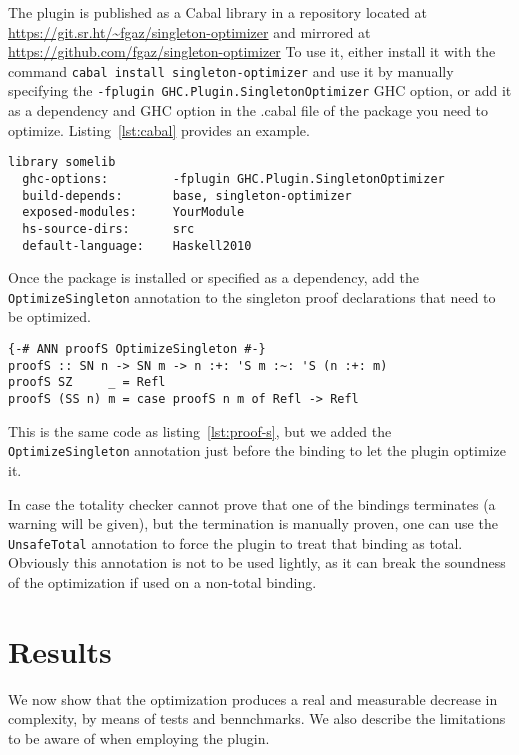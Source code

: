 The plugin is published as a Cabal library in a repository located at \url{https://git.sr.ht/~fgaz/singleton-optimizer} and mirrored at \url{https://github.com/fgaz/singleton-optimizer}
To use it, either install it with the command \texttt{cabal install singleton-optimizer} and use it by manually specifying the \texttt{-fplugin GHC.Plugin.SingletonOptimizer} GHC option, or add it as a dependency and GHC option in the .cabal file of the package you need to optimize.
Listing~\ref{lst:cabal} provides an example.

\begin{lstlisting}[label=lst:cabal, caption=Example .cabal stanza]
library somelib
  ghc-options:         -fplugin GHC.Plugin.SingletonOptimizer
  build-depends:       base, singleton-optimizer
  exposed-modules:     YourModule
  hs-source-dirs:      src
  default-language:    Haskell2010
\end{lstlisting}

Once the package is installed or specified as a dependency, add the \texttt{OptimizeSingleton} annotation to the singleton proof declarations that need to be optimized.

\begin{lstlisting}[caption=Optimizing \texttt{proofS}]
{-# ANN proofS OptimizeSingleton #-}
proofS :: SN n -> SN m -> n :+: 'S m :~: 'S (n :+: m)
proofS SZ     _ = Refl
proofS (SS n) m = case proofS n m of Refl -> Refl
\end{lstlisting}

This is the same code as listing~\ref{lst:proof-s}, but we added the \texttt{OptimizeSingleton} annotation just before the binding to let the plugin optimize it.

In case the totality checker cannot prove that one of the bindings terminates (a warning will be given), but the termination is manually proven, one can use the \texttt{UnsafeTotal} annotation to force the plugin to treat that binding as total.
Obviously this annotation is not to be used lightly, as it can break the soundness of the optimization if used on a non-total binding.

\chapter{Results}
\label{cha:results}

We now show that the optimization produces a real and measurable decrease in complexity, by means of tests and bennchmarks.
We also describe the limitations to be aware of when employing the plugin.

